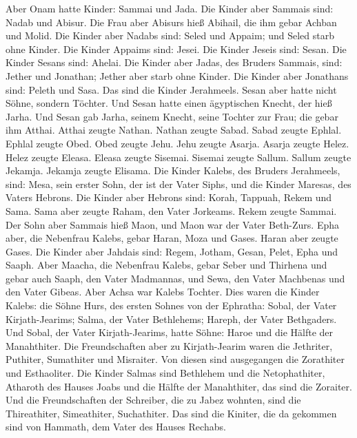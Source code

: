  Aber Onam hatte Kinder: Sammai und Jada. Die Kinder aber
Sammais sind: Nadab und Abisur.  Die Frau aber Abisurs
hieß Abihail, die ihm gebar Achban und Molid.  Die Kinder
aber Nadabs sind: Seled und Appaim; und Seled starb ohne Kinder.
 Die Kinder Appaims sind: Jesei. Die Kinder Jeseis sind:
Sesan. Die Kinder Sesans sind: Ahelai.  Die Kinder aber
Jadas, des Bruders Sammais, sind: Jether und Jonathan; Jether aber starb
ohne Kinder.  Die Kinder aber Jonathans sind: Peleth und
Sasa. Das sind die Kinder Jerahmeels.  Sesan aber hatte
nicht Söhne, sondern Töchter. Und Sesan hatte einen ägyptischen Knecht,
der hieß Jarha.  Und Sesan gab Jarha, seinem Knecht,
seine Tochter zur Frau; die gebar ihm Atthai.  Atthai
zeugte Nathan. Nathan zeugte Sabad.  Sabad zeugte Ephlal.
Ephlal zeugte Obed.  Obed zeugte Jehu. Jehu zeugte
Asarja.  Asarja zeugte Helez. Helez zeugte Eleasa.
 Eleasa zeugte Sisemai. Sisemai zeugte Sallum.
 Sallum zeugte Jekamja. Jekamja zeugte Elisama.
 Die Kinder Kalebs, des Bruders Jerahmeels, sind: Mesa,
sein erster Sohn, der ist der Vater Siphs, und die Kinder Maresas, des
Vaters Hebrons.  Die Kinder aber Hebrons sind: Korah,
Tappuah, Rekem und Sama.  Sama aber zeugte Raham, den
Vater Jorkeams. Rekem zeugte Sammai.  Der Sohn aber
Sammais hieß Maon, und Maon war der Vater Beth-Zurs. 
Epha aber, die Nebenfrau Kalebs, gebar Haran, Moza und Gases. Haran aber
zeugte Gases.  Die Kinder aber Jahdais sind: Regem,
Jotham, Gesan, Pelet, Epha und Saaph.  Aber Maacha, die
Nebenfrau Kalebs, gebar Seber und Thirhena  und gebar
auch Saaph, den Vater Madmannas, und Sewa, den Vater Machbenas und den
Vater Gibeas. Aber Achsa war Kalebs Tochter.  Dies waren
die Kinder Kalebs: die Söhne Hurs, des ersten Sohnes von der Ephratha:
Sobal, der Vater Kirjath-Jearims;  Salma, der Vater
Bethlehems; Hareph, der Vater Bethgaders.  Und Sobal, der
Vater Kirjath-Jearims, hatte Söhne: Haroe und die Hälfte der
Manahthiter.  Die Freundschaften aber zu Kirjath-Jearim
waren die Jethriter, Puthiter, Sumathiter und Misraiter. Von diesen sind
ausgegangen die Zorathiter und Esthaoliter.  Die Kinder
Salmas sind Bethlehem und die Netophathiter, Atharoth des Hauses Joabs
und die Hälfte der Manahthiter, das sind die Zoraiter. 
Und die Freundschaften der Schreiber, die zu Jabez wohnten, sind die
Thireathiter, Simeathiter, Suchathiter. Das sind die Kiniter, die da
gekommen sind von Hammath, dem Vater des Hauses Rechabs.

